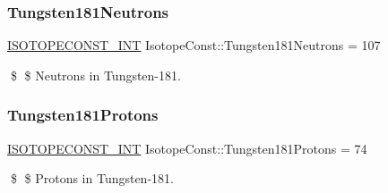 \subsubsection{\texorpdfstring{Tungsten181\+Neutrons}{Tungsten181Neutrons}}
{\footnotesize\ttfamily \mbox{\hyperlink{group___isotope_const-_macros_ga5f18360b3e99483a35c32d789e62621c}{I\+S\+O\+T\+O\+P\+E\+C\+O\+N\+S\+T\+\_\+\+I\+NT}} Isotope\+Const\+::\+Tungsten181\+Neutrons = 107}

\$ \$ Neutrons in Tungsten-\/181. \mbox{\label{group___isotope_const-_tungsten-_w181_gab2d544bf8bb2a2d4b8b4a9b37cdca1b9}} 
\subsubsection{\texorpdfstring{Tungsten181\+Protons}{Tungsten181Protons}}
{\footnotesize\ttfamily \mbox{\hyperlink{group___isotope_const-_macros_ga5f18360b3e99483a35c32d789e62621c}{I\+S\+O\+T\+O\+P\+E\+C\+O\+N\+S\+T\+\_\+\+I\+NT}} Isotope\+Const\+::\+Tungsten181\+Protons = 74}

\$ \$ Protons in Tungsten-\/181. 